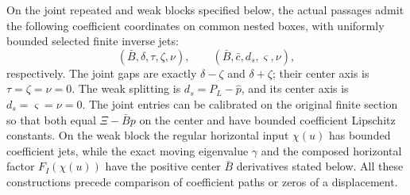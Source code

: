 \begin{proposition}
\label{rw:center-coordinates}
On the joint repeated and weak blocks specified below, the actual
passages admit the following coefficient coordinates on common nested
boxes, with uniformly bounded selected finite inverse jets:
\[
 (\bar B,\delta,\tau,\zeta,\nu),\qquad
 (\bar B,\bar c,d_s,\varsigma,\nu),
\]
respectively. The joint gaps are exactly $\delta-\zeta$ and
$\delta+\zeta$; their center axis is $\tau=\zeta=\nu=0$.
The weak splitting is $d_s=P_L-\widehat p$, and its center axis is
$d_s=\varsigma=\nu=0$. The joint entries can be calibrated on the
original finite section so that both equal $\Xi-\bar Bp$ on the
center and have bounded coefficient Lipschitz constants. On the weak
block the regular horizontal input $\chi(u)$ has bounded coefficient
jets, while the exact moving eigenvalue $\gamma$ and the composed
horizontal factor $F_I(\chi(u))$ have the positive center $\bar B$
derivatives stated below. All these constructions precede
comparison of coefficient paths or zeros of a displacement.
\end{proposition}
